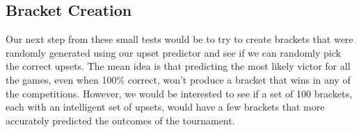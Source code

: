 \subsection{Bracket Creation}
Our next step from these small tests would be to try to create brackets that were randomly generated using our upset predictor and see if we can randomly pick the correct upsets.
The mean idea is that predicting the most likely victor for all the games, even when 100\% correct, won't produce a bracket that wins in any of the competitions.
However, we would be interested to see if a set of 100 brackets, each with an intelligent set of upsets, would have a few brackets that more accurately predicted the outcomes of the tournament.

